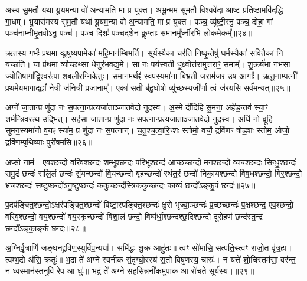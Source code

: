 अ॒स्य॒ सु॒म॒तौ यथा॑ यू॒यम॒न्या वो॑ अ॒न्यामति॒ मा प्र यु॑क्त। अभू॒न्मम॑ सुम॒तौ वि॒श्ववे॑दा॒ आष्ट॑ प्रति॒ष्ठामवि॑द॒द्धि गा॒धम्। भू॒यास॑मस्य सुम॒तौ यथा॑ यू॒यम॒न्या वो॑ अ॒न्यामति॒ मा प्र यु॑क्त। पञ्च॒ व्यु॑ष्टी॒रनु॒ पञ्च॒ दोहा॒ गां पञ्च॑नाम्नीमृ॒तवो\-ऽनु॒ पञ्च॑। पञ्च॒ दिशः॑ पञ्चद॒शेन॒ कॢ॒प्ताः स॑मा॒नमू᳚र्ध्नीर॒भि लो॒कमेकम्᳚॥२४॥

ऋ॒तस्य॒ गर्भः॑ प्रथ॒मा व्यू॒षुष्य॒पामेका॑ महि॒मान॑म्बिभर्ति। सूर्य॒स्यैका॒ चर॑ति निष्कृ॒तेषु॑ घ॒र्मस्यैका॑ सवि॒तैकां॒ नि य॑च्छति। या प्र॑थ॒मा व्यौच्छ॒थ्सा धे॒नुर॑भवद्य॒मे। सा नः॒ पय॑स्वती धु॒क्ष्वोत्त॑रामुत्तरा॒ꣳ॒ समाम्᳚। शु॒क्रर्\mbox{}ष॑भा॒ नभ॑सा॒ ज्योति॒षागा᳚द्वि॒श्वरू॑पा शब॒लीर॒ग्निके॑तुः। स॒मा॒नमर्थꣴ॑ स्वप॒स्यमा॑ना॒ बिभ्र॑ती ज॒राम॑जर उष॒ आगाः᳚। ऋ॒तू॒नाम्पत्नी᳚ प्रथ॒मेयमागा॒दह्नां᳚ ने॒त्री ज॑नि॒त्री प्र॒जानाम्᳚। एका॑ स॒ती ब॑हु॒धोषो॒ व्यु॑च्छ॒स्यजी᳚र्णा॒ त्वं ज॑रयसि॒ सर्व॑म॒न्यत्॥२५॥

{\anuvakamend[{ऊर्ज॒मेका᳚ प्रतिमु॒ञ्चमा॑ना भू॒यास॒मेकं॒ पत्न्येका॒न्नविꣳ॑श॒तिश्च॑॥11॥}]}

अग्ने॑ जा॒तान्प्र णु॑दा नः स॒पत्ना॒न्प्रत्यजा॑ताञ्जातवेदो नुदस्व। अ॒स्मे दी॑दिहि सु॒मना॒ अहे॑ड॒न्तव॑ स्या॒ꣳ॒ शर्म॑न्त्रि॒वरू॑थ उ॒द्भित्। सह॑सा जा॒तान्प्र णु॑दा नः स॒पत्ना॒न्प्रत्यजा॑ताञ्जातवेदो नुदस्व। अधि॑ नो ब्रूहि सुमन॒स्यमा॑नो व॒यꣴ स्या॑म॒ प्र णु॑दा नः स॒पत्नान्॑। च॒तु॒श्च॒त्वा॒रि॒ꣳ॒शः स्तोमो॒ वर्चो॒ द्रवि॑णꣳ षोड॒शः स्तोम॒ ओजो॒ द्रवि॑णम्पृथि॒व्याः पुरी॑षमसि॥२६॥

अप्सो॒ नाम॑। एव॒श्छन्दो॒ वरि॑व॒श्छन्दः॑ श॒म्भूश्छन्दः॑ परि॒भूश्छन्द॑ आ॒च्छच्छन्दो॒ मन॒श्छन्दो॒ व्यच॒श्छन्दः॒ सिन्धु॒श्छन्दः॑ समु॒द्रं छन्दः॑ सलि॒लं छन्दः॑ सं॒यच्छन्दो॑ वि॒यच्छन्दो॑ बृ॒हच्छन्दो॑ रथंत॒रं छन्दो॑ निका॒यश्छन्दो॑ विव॒धश्छन्दो॒ गिर॒श्छन्दो॒ भ्रज॒श्छन्दः॑ स॒ष्टुप्छन्दो॑\-ऽनु॒ष्टुप्छन्दः॑ क॒कुच्छन्द॑स्त्रिक॒कुच्छन्दः॑ का॒व्यं छन्दो᳚\-ऽङ्कु॒पं छन्दः॑॥२७॥

प॒दप॑ङ्क्ति॒श्छन्दो॒\-ऽक्षर॑पङ्क्ति॒श्छन्दो॑ विष्टा॒रप॑ङ्क्ति॒श्छन्दः॑ क्षु॒रो भृज्वा॒ञ्छन्दः॑ प्र॒च्छच्छन्दः॑ प॒क्षश्छन्द॒ एव॒श्छन्दो॒ वरि॑व॒श्छन्दो॒ वय॒श्छन्दो॑ वय॒स्कृच्छन्दो॑ विशा॒लं छन्दो॒ विष्प॑र्धा॒श्छन्द॑श्छ॒दिश्छन्दो॑ दूरोह॒णं छन्द॑स्त॒न्द्रं छन्दो᳚\-ऽङ्का॒ङ्कं छन्दः॑॥२८॥

{\anuvakamend[{अ॒स्य॒ङ्कु॒पञ्छन्द॒स्त्रय॑स्त्रिꣳशच्च॥12॥}]}

अ॒ग्निर्वृ॒त्राणि॑ जङ्घनद्द्रविण॒स्युर्वि॑प॒न्यया᳚। समि॑द्धः शु॒क्र आहु॑तः॥ त्वꣳ सो॑मासि॒ सत्प॑ति॒स्त्वꣳ राजो॒त वृ॑त्र॒हा। त्वम्भ॒द्रो अ॑सि॒ क्रतुः॑॥ भ॒द्रा ते॑ अग्ने स्वनीक सं॒दृग्घो॒रस्य॑ स॒तो विषु॑णस्य॒ चारुः॑। न यत्ते॑ शो॒चिस्तम॑सा॒ वर॑न्त॒ न ध्व॒स्मान॑स्त॒नुवि॒ रेप॒ आ धुः॑॥ भ॒द्रं ते॑ अग्ने सहसि॒न्ननी॑कमुपा॒क आ रो॑चते॒ सूर्य॑स्य।॥२९॥

